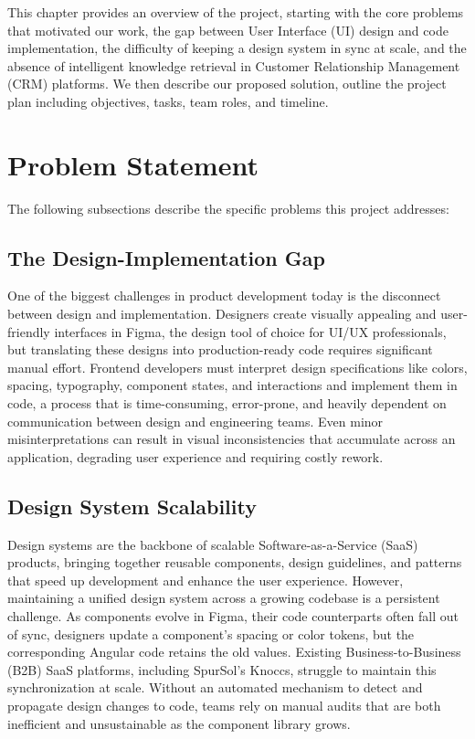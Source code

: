 This chapter provides an overview of the project, starting with the core problems that motivated our work, the gap between User Interface (UI) design and code implementation, the difficulty of keeping a design system in sync at scale, and the absence of intelligent knowledge retrieval in Customer Relationship Management (CRM) platforms. We then describe our proposed solution, outline the project plan including objectives, tasks, team roles, and timeline. 

\section{Problem Statement}

The following subsections describe the specific problems this project addresses:

\subsection{The Design-Implementation Gap}
One of the biggest challenges in product development today is the disconnect between design and implementation. Designers create visually appealing and user-friendly interfaces in Figma, the design tool of choice for UI/UX professionals, but translating these designs into production-ready code requires significant manual effort. Frontend developers must interpret design specifications like colors, spacing, typography, component states, and interactions and implement them in code, a process that is time-consuming, error-prone, and heavily dependent on communication between design and engineering teams. Even minor misinterpretations can result in visual inconsistencies that accumulate across an application, degrading user experience and requiring costly rework.

\subsection{Design System Scalability}
Design systems are the backbone of scalable Software-as-a-Service (SaaS) products, bringing together reusable components, design guidelines, and patterns that speed up development and enhance the user experience. However, maintaining a unified design system across a growing codebase is a persistent challenge. As components evolve in Figma, their code counterparts often fall out of sync, designers update a component's spacing or color tokens, but the corresponding Angular code retains the old values. Existing Business-to-Business (B2B) SaaS platforms, including SpurSol's Knoccs, struggle to maintain this synchronization at scale. Without an automated mechanism to detect and propagate design changes to code, teams rely on manual audits that are both inefficient and unsustainable as the component library grows.

